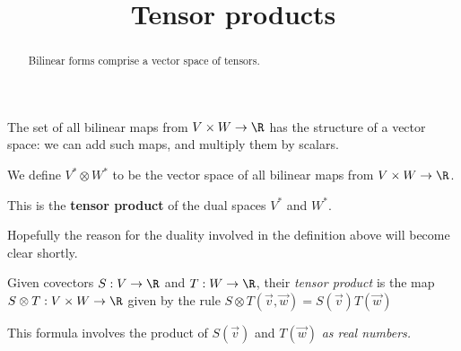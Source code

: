 \documentclass{ximera}
\title{Tensor products}
\begin{document}
\begin{abstract}
  Bilinear forms comprise a vector space of tensors.
\end{abstract}	

The set of all bilinear maps from $V \times W \to \R$ has the structure of a vector space: we can add such maps, and multiply them by scalars.

\begin{definition}
  We define $V^* \otimes W^*$ to be the vector space of all bilinear maps from $V \times W \to \R$.

  This is the \textbf{tensor product} of the dual spaces $V^*$ and $W^*$.
\end{definition}
	
Hopefully the reason for the duality involved in the definition above will become clear shortly.
				
Given covectors $S : V \to \R$ and $T : W \to \R$, their \textit{tensor product} is the map 
$S \otimes T: V \times W \to \R$ given by the rule $S \otimes T(\vec{v},\vec{w}) = S(\vec{v}) T(\vec{w})$

\begin{warning}
This formula involves the product of $S(\vec{v})$ and $T(\vec{w})$ \textit{as real numbers.}
\end{warning}
\end{document}
